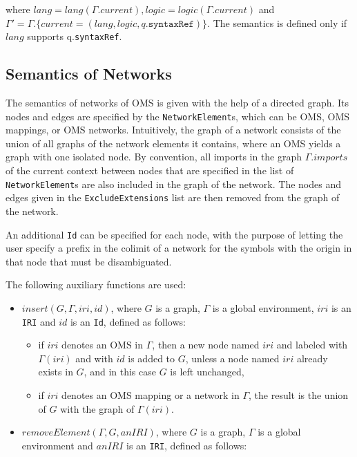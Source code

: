 \documentclass[10pt,fleqn,final]{scrreprt}
\newcommand*{\syntax}[1]{\texttt{#1}}
\newcommand{\current}{\mathit{current}}
\newcommand{\ssclause}[1]{\subsection{#1}}
\newenvironment{definitions}[0]{\medskip }{}
\begin{document}
\begin{definitions}
\noindent where $lang = lang(\Gamma.\current), logic = logic(\Gamma.\current)$ and\\
$\Gamma'  = \Gamma.\{\current = (lang, logic, q.\syntax{syntaxRef})\}$. 
The semantics is defined only if $\mathit{lang}$ supports q.\syntax{syntaxRef}.

\ssclause{Semantics of Networks}

The semantics of networks of OMS is given with the help of a directed graph. Its nodes
and edges are specified by the \syntax{NetworkElement}s, which can be OMS, OMS mappings, or OMS networks. Intuitively, the graph of a
network consists of the union of all graphs of the network elements it
contains, where an OMS yields a graph with one isolated node. By convention,
all imports in the graph $\Gamma.imports$ of the current context between nodes that are
specified in the list of \syntax{NetworkElement}s are also included in the graph of 
the network. 
The nodes and edges given in the \syntax{ExcludeExtensions} list are then removed from the graph of the network. 

An additional \syntax{Id} can be specified for each node, with the purpose of letting the user specify a 
prefix in the colimit of a network for the symbols with the origin in that node that must be disambiguated.

 The following auxiliary functions are used: 

\begin{itemize}
\item $insert(G, \Gamma, iri,id)$, where $G$ is a graph, 
      $\Gamma$ is a global environment, $iri$ is an \syntax{IRI} and 
      $id$ is an \syntax{Id}, defined as follows:
 \begin{itemize}
    \item if $iri$ denotes an OMS in $\Gamma$, then
                 a new node named $iri$ and labeled with $\Gamma(iri)$ and with $id$ is added to $G$,
                 unless a node named $iri$ already exists in $G$, and in this case $G$ is left unchanged,
   \item if $iri$ denotes an OMS mapping 
      or a network in $\Gamma$, 
      the result is the union of $G$ with the graph of $\Gamma(iri)$.
 \end{itemize}

\item $removeElement(\Gamma, G, anIRI)$, where $G$ is a graph, 
      $\Gamma$ is a global environment and $anIRI$ is an \syntax{IRI},
      defined as follows: 


\end{itemize}
\end{definitions}
\end{document}

